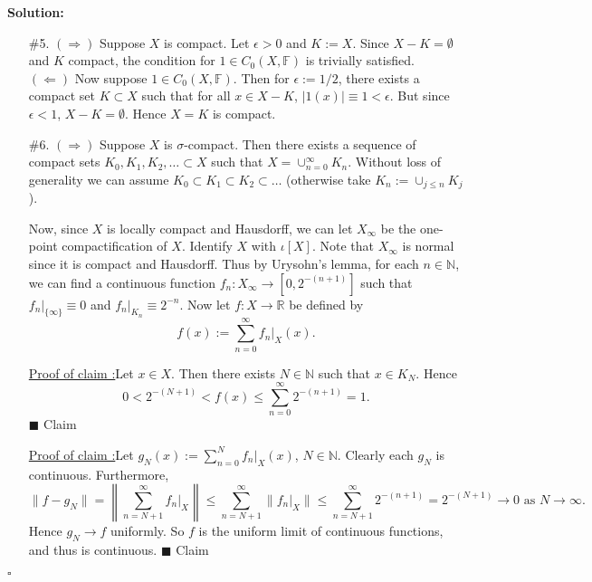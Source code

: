 \documentclass[12pt]{article}
\newcounter{ProofCounter}
\newcounter{ClaimCounter}[ProofCounter]
\newenvironment{Solution}{\stepcounter{ProofCounter}\textbf{Solution:}}{\hfill$\square$}
\newenvironment{claim}[1]{\vspace{1mm}\stepcounter{ClaimCounter}\par\noindent\underline{\bf Claim \theClaimCounter:}\space#1}{}
\newenvironment{claimproof}[1]{\par\noindent\underline{Proof of claim \theClaimCounter:}\space#1}{\hfill $\blacksquare$ Claim \theClaimCounter}
\begin{document}
\begin{Solution}
\begin{enumerate}
      \vspace{1cm}

    \item[\#5.] $(\Rightarrow)$ Suppose $X$ is compact. Let $\epsilon > 0$ and $K := X$. Since $X - K = \emptyset$ and $K$ compact, the condition for
      $1 \in C_0(X, \mathbb{F})$ is  trivially satisfied. \\

      $(\Leftarrow)$ Now suppose $1 \in C_0(X, \mathbb{F})$. Then for $\epsilon := 1/2$, there exists a compact set $K \subset X$ such that for all $x
      \in X - K$, $|1(x)| \equiv 1 < \epsilon$. But since $\epsilon < 1$, $X - K = \emptyset$. Hence $X = K$ is compact.

      \vspace{1cm}

    \item[\#6.] $(\Rightarrow)$ Suppose $X$ is $\sigma$-compact. Then there exists a sequence of compact sets $K_0, K_1, K_2, \dots \subset X$ such
      that $X = \cup_{n=0}^{\infty}K_n$. Without loss of generality we can assume $K_0 \subset K_1 \subset K_2 \subset \dots$ (otherwise take $K_n :=
      \cup_{j \leq n} K_j$). 
      
      Now, since $X$ is locally compact and Hausdorff, we can let $X_{\infty}$ be the one-point compactification of $X$. Identify $X$ with $\iota[X]$.
      Note that $X_{\infty}$ is
      normal since it is compact and Hausdorff. Thus by Urysohn's lemma, for each $n \in \mathbb{N}$, we can find a continuous function $f_{n} :
      X_{\infty} \rightarrow [0,2^{-(n+1)}]$ such that $f_{n}\big|_{\{\infty\}} \equiv 0$ and $f_{n}\big|_{K_n} \equiv 2^{-n}$. Now let $f : X \rightarrow
      \mathbb{R}$ be defined by 
      \[
        f(x) := \sum_{n=0}^{\infty} f_{n}\big|_{X}(x).
      \]
      \begin{claimproof}
        Let $x \in X$. Then there exists $N \in \mathbb{N}$ such that $x \in K_N$. Hence 
        \[
          0 < 2^{-(N+1)} < f(x) \leq \sum_{n=0}^{\infty}2^{-(n+1)} = 1.
        \]
      \end{claimproof}

      \begin{claimproof}
        Let $g_{N}(x) :=  \sum_{n=0}^{N}f_n\big|_{X}(x)$, $N \in \mathbb{N}$. Clearly each $g_N$ is continuous. Furthermore,
        \[
          \big\| f - g_N \big\| = \left\|\sum_{n=N+1}^{\infty} f_n\big|_{X}\right\| \leq \sum_{n=N+1}^{\infty}\big\|f_n\big|_{X}\big\|
          \leq \sum_{n=N+1}^{\infty} 2^{-(n+1)} = 2^{-(N+1)} \rightarrow 0 \text{ as } N \rightarrow \infty.
        \]
        Hence $g_N \rightarrow f$ uniformly. So $f$ is the uniform limit of continuous functions, and thus is continuous.
      \end{claimproof}


\end{enumerate}
\end{Solution}
\end{document}
